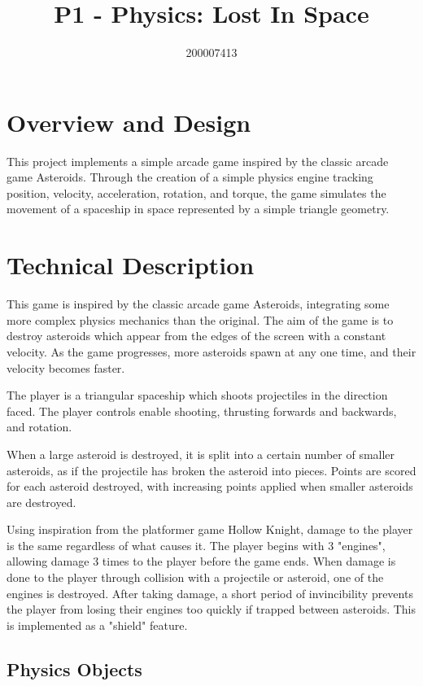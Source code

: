 \documentclass[12pt, a4paper]{article}
\title{P1 - Physics: Lost In Space}
\author{200007413}
\date{}
\begin{document}
{\bfseries\huge\thetitle}

{\large\theauthor}

\section{Overview and Design}

This project implements a simple arcade game inspired by the classic arcade game Asteroids. Through the creation of a simple physics engine tracking position, velocity, acceleration, rotation, and torque, the game simulates the movement of a spaceship in space represented by a simple triangle geometry.

\section{Technical Description}

This game is inspired by the classic arcade game Asteroids, integrating some more complex physics mechanics than the original. The aim of the game is to destroy asteroids which appear from the edges of the screen with a constant velocity. As the game progresses, more asteroids spawn at any one time, and their velocity becomes faster.

The player is a triangular spaceship which shoots projectiles in the direction faced. The player controls enable shooting, thrusting forwards and backwards, and rotation.


When a large asteroid is destroyed, it is split into a certain number of smaller asteroids, as if the projectile has broken the asteroid into pieces. Points are scored for each asteroid destroyed, with increasing points applied when smaller asteroids are destroyed.

Using inspiration from the platformer game Hollow Knight, damage to the player is the same regardless of what causes it. The player begins with 3 "engines", allowing damage 3 times to the player before the game ends. When damage is done to the player through collision with a projectile or asteroid, one of the engines is destroyed. After taking damage, a short period of invincibility prevents the player from losing their engines too quickly if trapped between asteroids. This is implemented as a "shield" feature.

\subsection{Physics Objects}
\end{document}
